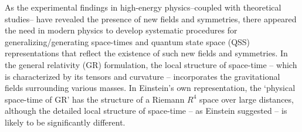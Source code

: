 \documentclass[12pt]{article}
\theoremstyle{plain}
\theoremstyle{definition}
\numberwithin{equation}{section}
\begin{document}
   As the experimental findings in high-energy physics--coupled with 
theoretical studies-- have revealed the presence of new fields and symmetries, 
there appeared the need in modern physics to develop systematic procedures for 
generalizing/generating space-times and quantum state space (QSS) 
representations that reflect the existence of such new fields and symmetries.
    In the general relativity (GR) formulation, the local structure of space-time -- which is characterized by its tensors and curvature -- incorporates the gravitational fields surrounding various masses.  In Einstein's own representation, the `physical space-time of GR' has the structure of a Riemann $R^4$ space over large distances, 
although the detailed local structure of space-time -- as Einstein suggested -- is likely to 
be significantly different. 
\end{document}
